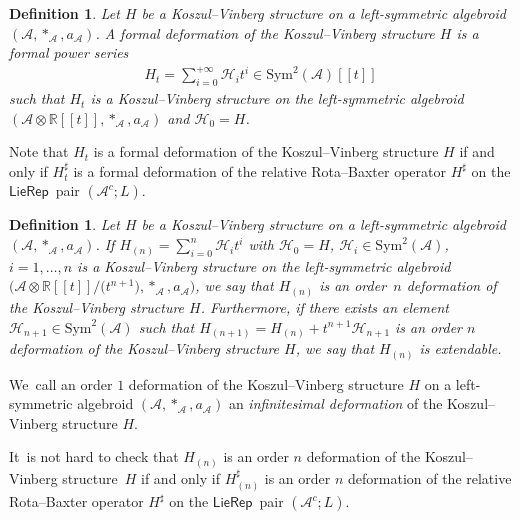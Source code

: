 \documentclass[pdftex]{sigma}%
\numberwithin{equation}{section}
\newtheorem{defi}[thm]{Definition}
\newcommand{\Real}{\mathbb R}
\newcommand{\huaA}{\mathcal{A}}
\newcommand{\huaH}{\mathcal{H}}
\newcommand{\Sym}{\mathrm{Sym}}
\newcommand{\LP}{$\mathsf{LieRep}$~}
\begin{document}
\begin{defi}
{\sloppy Let $H$ be a Koszul--Vinberg structure on a left-symmetric algebroid $(\huaA,\ast_\huaA,a_\huaA)$. A {\it formal deformation} of the Koszul--Vinberg structure $H$ is a formal power series
\begin{gather*}
H_t=\sum_{i=0}^{+\infty}\huaH_it^i\in\Sym^2(\huaA)[[t]]
\end{gather*}}\noindent
 such that $H_t$ is a Koszul--Vinberg structure on the left-symmetric algebroid $(\huaA\otimes \Real[[t]],\ast_\huaA,a_\huaA)$ and $\huaH_0=H$.
\end{defi}
Note that $H_t$ is a formal deformation of the Koszul--Vinberg structure $H$ if and only if $H_t^\sharp$ is a formal deformation of the relative Rota--Baxter operator $H^\sharp$ on the \LP pair $(\huaA^c;L)$.

{\sloppy\begin{defi}
Let $H$ be a Koszul--Vinberg structure on a left-symmetric algebroid $(\huaA,\ast_\huaA,a_\huaA)$. If $H_{(n)}=\sum_{i=0}^{n}\huaH_it^i$ with $\huaH_0=H$, $\huaH_i\in\Sym^2(\huaA)$, $i=1,\dots,n$ is a Koszul--Vinberg structure on the left-symmetric algebroid $\big(\huaA\otimes \Real[[t]]/\big(t^{n+1}\big),\ast_\huaA,a_\huaA\big)$, we say that $H_{(n)}$ is an {\it order~$n$ deformation} of the Koszul--Vinberg structure $H$. Furthermore, if there exists an element $\huaH_{n+1}\in\Sym^2(\huaA)$ such that $H_{(n+1)}=H_{(n)}+t^{n+1}\huaH_{n+1}$ is an order $n$ deformation of the Koszul--Vinberg structure $H$, we say that $H_{(n)}$ is {\it extendable}.
\end{defi}}\noindent
 We~call an order $1$ deformation of the Koszul--Vinberg structure $H$ on a left-symmetric algebroid $(\huaA,\ast_\huaA,a_\huaA)$ an {\it infinitesimal deformation} of the Koszul--Vinberg structure $H$.

It~is not hard to check that $H_{(n)}$ is an order $n$ deformation of the Koszul--Vinberg structure~$H$ if and only if $H_{(n)}^\sharp$ is an order $n$ deformation of the relative Rota--Baxter operator $H^\sharp$ on the \LP pair $(\huaA^c;L)$.
\end{document}
